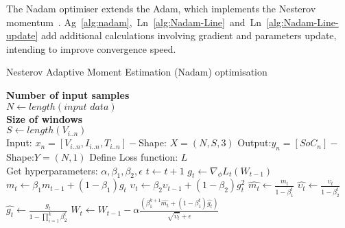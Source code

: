 %
The Nadam optimiser extends the Adam, which implements the Nesterov momentum~\cite{dozat_nadam_2016}.
\mbox{Ag~\ref{alg:nadam}, Ln~\ref{alg:Nadam-Line} and Ln~\ref{alg:Nadam-Line-update}} add additional calculations involving gradient and parameters update, intending to improve convergence speed.
\begin{algorithm}
    \caption{Nesterov Adaptive Moment Estimation (Nadam) optimisation}
    \begin{algorithmic}[1]
      \STATE \textbf{Number of input samples} \\ $N\gets length(\textit{input data})$\\
      \STATE \textbf{Size of windows} \\ $S\gets length(V_{i..n})$\\
      \STATE Input: $x_n = [V_{i..n}, I_{i..n}, T_{i..n}] - $Shape: $X = (N, S, 3)$
      \STATE Output:$y_n = [SoC_{n}] - $Shape:$Y = (N, 1)$
      \STATE Define Loss function: $L$ \\
             Get hyperparameters: $\alpha, \beta_1, \beta_2, \epsilon$
      \STATE $t \gets t+1$
      \STATE $g_t \gets \nabla_\phi L_t (W_{t-1})$ 
      \STATE $m_t \gets \beta_1 m_{t-1}+(1-\beta_1) g_t $ 
      \STATE $\upsilon_t \gets \beta_2 \upsilon_{t-1}+ \left(1-\beta_2 \right)g^2_t $ 
      \STATE $\hat{m_t} \gets \frac{m_t}{1-\beta^t_1}$ 
      \STATE $\hat{\upsilon_t} \gets \frac{\upsilon_t}{1-\beta^t_2} $ 
      \STATE $\hat{g_t} \gets \frac{g_t}{1-\prod\nolimits_{i = 1}^{k}\beta^t_2} $ 
      \STATE $W_t \gets W_{t-1}-\alpha
                          \frac{\left(\beta^{k+1}_1\hat{m_t}+\left(1-\beta^t_1\right)\hat{g_t}\right)}
                               {\sqrt{\hat{\upsilon_t}}+\epsilon}$
      \ENDWHILE
    \end{algorithmic}
    \label{alg:nadam}
\end{algorithm}

